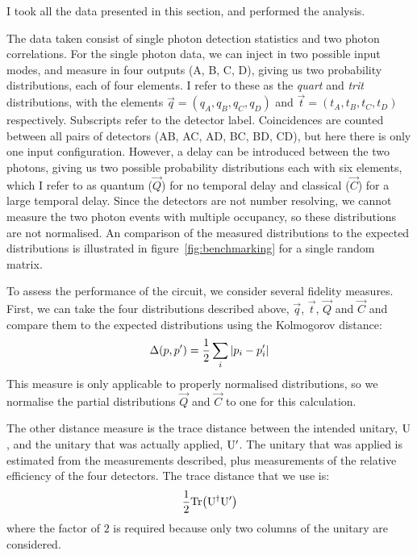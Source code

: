 I took all the data presented in this section, and performed the analysis.

The data taken consist of single photon detection statistics and two photon
correlations. For the single photon data, we can inject in two possible input
modes, and measure in four outputs (A, B, C, D), giving us two probability
distributions, each of four elements. I refer to these as the \emph{quart}
and \emph{trit} distributions, with the elements \(\vec{q}= \left( q_{A}, q_{B},
q_{C}, q_{D} \right)\) and \(\vec{t} = \left( t_{A}, t_{B}, t_{C}, t_{D}
\right)\) respectively. Subscripts refer to the detector label. Coincidences are
counted between all pairs of detectors (AB, AC, AD, BC, BD, CD), but here there
is only one input configuration. However, a delay can be introduced between
the two photons, giving us two possible probability distributions each with six
elements, which I refer to as quantum (\(\vec{Q}\)) for no temporal delay and
classical (\(\vec{C}\)) for a large temporal delay. Since the detectors are not
number resolving, we cannot measure the two photon events with multiple
occupancy, so these distributions are not normalised. An comparison of the
measured distributions to the expected distributions is illustrated in
figure~\ref{fig:benchmarking} for a single random matrix.

To assess the performance of the circuit, we consider several fidelity measures.
First, we can take the four distributions described above, \(\vec{q}\),
\(\vec{t}\), \(\vec{Q}\) and \(\vec{C}\) and compare them to the expected
distributions using the Kolmogorov distance:
\begin{equation}
  \Delta \!\left( p,p^{\prime} \right) = \frac{1}{2} \sum_{i} \left|p_{i} - p_{i}^{\prime}\right|
\end{equation}
This measure is only applicable to properly normalised distributions, so we
normalise the partial distributions \(\vec{Q}\) and \(\vec{C}\) to one for this
calculation.

The other distance measure is the trace distance between the intended unitary,
\(\mathrm{U}\), and the unitary that was actually applied, \(\mathrm{U}^{\prime}\).
The unitary that was applied is estimated from the measurements described, plus
measurements of the relative efficiency of the four detectors. The trace
distance that we use is:
\begin{equation}
  \frac{1}{2} \mathrm{Tr} \!\left( \mathrm{U}^{\dagger} \mathrm{U}^{\prime} \right)
\end{equation}
where the factor of \(2\) is required because only two columns of the unitary
are considered.

